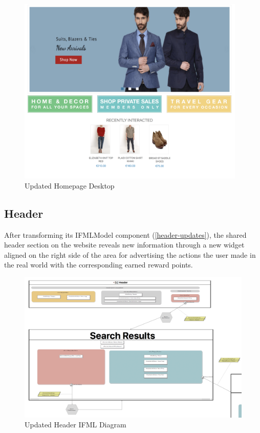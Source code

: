 \begin{figure}[H]
  \centering
    \includegraphics[height=9cm]{images/diagrams/after/desktop-homepage.png}
  \caption{Updated Homepage Desktop}
  \label{fig:desktop-before-homepage}
\end{figure}
\vspace{0.5cm}

\newpage
\subsection{Header}

After transforming its IFMLModel component (\ref{header-updates}), the shared header section on the website reveals new information through a new widget aligned on the right side of the area for advertising the actions the user made in the real world with the corresponding earned reward points.

\vspace{0.5cm}
\begin{figure}[H]
  \centering
    \includegraphics[width=14cm]{images/diagrams/after/ifml-header.png}
  \caption{Updated Header IFML Diagram}
  \label{fig:ifml-after-homepage}
\end{figure}

